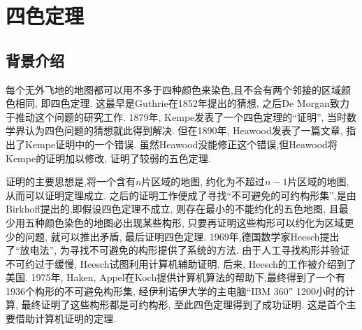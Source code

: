 \documentclass[main]{subfiles}
\begin{document}
\renewcommand{\filename}{subfile11}%
{}

\section{四色定理}
\subsection{背景介绍}
每个无外飞地的地图都可以用不多于四种颜色来染色,且不会有两个邻接的区域颜色相同, 即四色定理. 这最早是Guthrie在1852年提出的猜想, 之后De Morgan致力于推动这个问题的研究工作. 1879年, Kempe发表了一个四色定理的``证明'', 当时数学界认为四色问题的猜想就此得到解决. 但在1890年, Heawood发表了一篇文章, 指出了Kempe证明中的一个错误. 虽然Heawood没能修正这个错误,但Heawood将Kempe的证明加以修改, 证明了较弱的五色定理.

证明的主要思想是,将一个含有$n$片区域的地图, 约化为不超过$n-1$片区域的地图, 从而可以证明定理成立.
之后的证明工作便成了寻找``不可避免的可约构形集'',是由Birkhoff提出的,即假设四色定理不成立, 则存在最小的不能约化的五色地图, 且最少用五种颜色染色的地图必出现某些构形, 只要再证明这些构形可以约化为区域更少的问题, 就可以推出矛盾, 最后证明四色定理. 1969年,德国数学家Heesch提出了``放电法'',
为寻找不可避免的构形提供了系统的方法. 由于人工寻找构形并验证不可约过于缓慢, Heesch试图利用计算机辅助证明. 后来, Heesch的工作被介绍到了美国. 1975年, Haken, Appel在Koch提供计算机算法的帮助下,最终得到了一个有1936个构形的不可避免构形集, 经伊利诺伊大学的主电脑``IBM 360'' 1200小时的计算, 最终证明了这些构形都是可约构形, 至此四色定理得到了成功证明. 这是首个主要借助计算机证明的定理.
\end{document}
